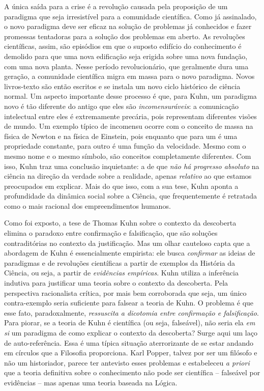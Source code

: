 \documentclass[./main.tex]{subfiles}
\begin{document}
\par A única saída para a crise é a revolução causada pela proposição de um paradigma que seja irresistível para a comunidade científica. Como já assinalado, o novo paradigma deve ser eficaz na solução de problemas já conhecidos e fazer promessas tentadoras para a solução dos problemas em aberto. As revoluções científicas, assim, são episódios em que o suposto edifício do conhecimento é demolido para que uma nova edificação seja erigida sobre uma nova fundação, com uma nova planta. Nesse período revolucionário, que geralmente dura uma geração, a comunidade científica migra em massa para o novo paradigma. Novos livros-texto são então escritos e se instala um novo ciclo histórico de ciência normal. Um aspecto importante desse processo é que, para Kuhn, um paradigma novo é tão diferente do antigo que eles são \textit{incomensuráveis}: a comunicação intelectual entre eles é extremamente precária, pois representam diferentes visões de mundo. Um exemplo típico de \gls{incomensu} ocorre com o conceito de massa na física de Newton e na física de Einstein, pois enquanto que para um é uma propriedade constante, para outro é uma função da velocidade. Mesmo com o mesmo nome e o mesmo símbolo, são conceitos completamente diferentes. Com isso, Kuhn traz uma conclusão inquietante: a de que \textit{não há progresso absoluto} na ciência na direção da verdade sobre a realidade, apenas \textit{relativo} ao que estamos preocupados em explicar. Mais do que isso, com a sua tese, Kuhn aponta a profundidade da dinâmica social sobre a Ciência, que frequentemente é retratada como o mais racional dos empreendimentos humanos.

\par Como foi exposto, a tese de Thomas Kuhn sobre o contexto da descoberta elimina o paradoxo entre confirmação e falsificação, que são soluções contraditórias no contexto da justificação. Mas um olhar cauteloso capta que a abordagem de Kuhn é essencialmente empirista: ele busca \textit{confirmar} as ideias de paradigmas e de revoluções científicas a partir de exemplos da História da Ciência, ou seja, a partir de \textit{evidências empíricas}. Kuhn utiliza a inferência indutiva para justificar uma teoria sobre o contexto da descoberta. Pela perspectiva racionalista crítica, por mais bem corroborada que seja, um único contra-exemplo seria suficiente para falsear a teoria de Kuhn. O problema é que esse fato, paradoxalmente, \textit{ressuscita a dicotomia entre confirmação e falsificação}. Para piorar, se a teoria de Kuhn é científica (ou seja, falseável), não seria ela \textit{em si} um paradigma de como explicar o contexto da descoberta? Surge aqui um laço de auto-referência. Essa é uma típica situação aterrorizante de se estar andando em círculos que a Filosofia proporciona. Karl Popper, talvez por ser um filósofo e não um historiador, parece ter antevisto esses problemas e estabeleceu \textit{a priori} que a teoria definitiva sobre o conhecimento não pode ser científica -- falseável por evidências -- mas apenas uma teoria baseada na Lógica.
\end{document}
